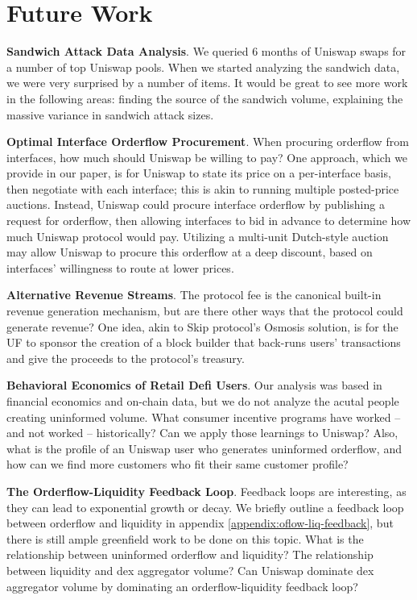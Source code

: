 \section{Future Work} \label{section:future-work}

\textbf{Sandwich Attack Data Analysis}. We queried 6 months of Uniswap swaps for a number of top Uniswap pools. When we started analyzing the sandwich data, we were very surprised by a number of items. It would be great to see more work in the following areas: finding the source of the sandwich volume, explaining the massive variance in sandwich attack sizes.

\textbf{Optimal Interface Orderflow Procurement}. When procuring orderflow from interfaces, how much should Uniswap be willing to pay? One approach, which we provide in our paper, is for Uniswap to state its price on a per-interface basis, then negotiate with each interface; this is akin to running multiple posted-price auctions. Instead, Uniswap could procure interface orderflow by publishing a request for orderflow, then allowing interfaces to bid in advance to determine how much Uniswap protocol would pay. Utilizing a multi-unit Dutch-style auction may allow Uniswap to procure this orderflow at a deep discount, based on interfaces' willingness to route at lower prices. %

\textbf{Alternative Revenue Streams}. The protocol fee is the canonical built-in revenue generation mechanism, but are there other ways that the protocol could generate revenue? One idea, akin to Skip protocol's Osmosis solution, is for the UF to sponsor the creation of a block builder that back-runs users' transactions and give the proceeds to the protocol's treasury.

\textbf{Behavioral Economics of Retail Defi Users}. Our analysis was based in financial economics and on-chain data, but we do not analyze the acutal people creating uninformed volume. What consumer incentive programs have worked -- and not worked -- historically? Can we apply those learnings to Uniswap? Also, what is the profile of an Uniswap user who generates uninformed orderflow, and how can we find more customers who fit their same customer profile?

\textbf{The Orderflow-Liquidity Feedback Loop}. Feedback loops are interesting, as they can lead to exponential growth or decay. We briefly outline a feedback loop between orderflow and liquidity in appendix \ref{appendix:oflow-liq-feedback}, but there is still ample greenfield work to be done on this topic. What is the relationship between uninformed orderflow and liquidity? The relationship between liquidity and dex aggregator volume? Can Uniswap dominate dex aggregator volume by dominating an orderflow-liquidity feedback loop?
